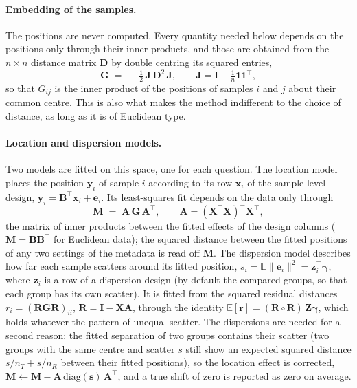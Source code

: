 \documentclass{article}
\begin{document}
\paragraph{Embedding of the samples.}
The positions are never computed. Every quantity needed below depends on the positions only through their inner products, and those are obtained from the $n \times n$ distance matrix $\mathbf{D}$ by double centring its squared entries,
\begin{equation}
\mathbf{G} \;=\; -\tfrac{1}{2}\,\mathbf{J}\,\mathbf{D}^{2}\,\mathbf{J}, \qquad \mathbf{J} = \mathbf{I} - \tfrac{1}{n}\mathbf{1}\mathbf{1}^\top ,
\end{equation}
so that $G_{ij}$ is the inner product of the positions of samples $i$ and $j$ about their common centre. This is also what makes the method indifferent to the choice of distance, as long as it is of Euclidean type.

\paragraph{Location and dispersion models.}
Two models are fitted on this space, one for each question. The location model places the position $\mathbf{y}_i$ of sample $i$ according to its row $\mathbf{x}_i$ of the sample-level design, $\mathbf{y}_i = \mathbf{B}^\top \mathbf{x}_i + \mathbf{e}_i$. Its least-squares fit depends on the data only through
\begin{equation}
\mathbf{M} \;=\; \mathbf{A}\,\mathbf{G}\,\mathbf{A}^\top, \qquad \mathbf{A} = (\mathbf{X}^\top\mathbf{X})^{-}\mathbf{X}^\top,
\end{equation}
the matrix of inner products between the fitted effects of the design columns ($\mathbf{M} = \mathbf{B}\mathbf{B}^\top$ for Euclidean data); the squared distance between the fitted positions of any two settings of the metadata is read off $\mathbf{M}$. The dispersion model describes how far each sample scatters around its fitted position, $s_i = \mathbb{E}\|\mathbf{e}_i\|^2 = \mathbf{z}_i^\top \boldsymbol{\gamma}$, where $\mathbf{z}_i$ is a row of a dispersion design (by default the compared groups, so that each group has its own scatter). It is fitted from the squared residual distances $r_i = (\mathbf{R}\mathbf{G}\mathbf{R})_{ii}$, $\mathbf{R} = \mathbf{I} - \mathbf{X}\mathbf{A}$, through the identity $\mathbb{E}[\mathbf{r}] = (\mathbf{R} \circ \mathbf{R})\,\mathbf{Z}\boldsymbol{\gamma}$, which holds whatever the pattern of unequal scatter. The dispersions are needed for a second reason: the fitted separation of two groups contains their scatter (two groups with the same centre and scatter $s$ still show an expected squared distance $s/n_T + s/n_R$ between their fitted positions), so the location effect is corrected, $\mathbf{M} \leftarrow \mathbf{M} - \mathbf{A}\,\mathrm{diag}(\mathbf{s})\,\mathbf{A}^\top$, and a true shift of zero is reported as zero on average.
\end{document}
